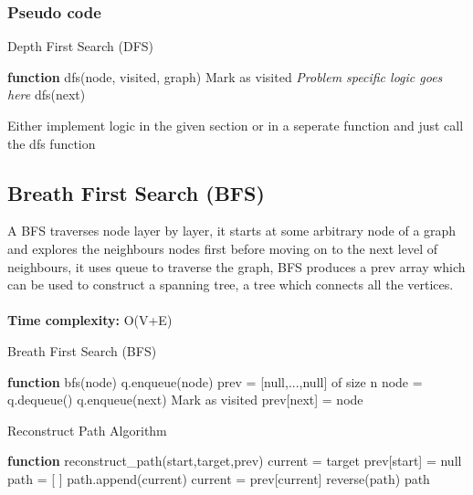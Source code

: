 \documentclass[12pt]{extarticle}
\begin{document}
\subsubsection*{Pseudo code}

\begin{algorithm} [H]
    \caption{Depth First Search (DFS)}
    \begin{algorithmic}[1]
        \STATE \textbf{function} dfs(node, visited, graph)
        \RETURN
        \ENDIF
        \STATE Mark as visited
        \STATE \textit{Problem specific logic goes here}
        \STATE dfs(next)
        \ENDFOR
    \end{algorithmic}
\end{algorithm}

Either implement logic in the given section or in a seperate function and just call 
the dfs function

\subsection{Breath First Search (BFS)}
A BFS traverses node layer by layer, it starts at some arbitrary node of a graph and explores the neighbours nodes first before moving on to the next level of neighbours, it uses queue to traverse the graph, BFS produces a prev array which can be used to construct
a spanning tree, a tree which connects all the vertices.\\ \\  
\textbf{Time complexity:} O(V+E)

\begin{algorithm}
    \caption {Breath First Search (BFS)}
    \begin{algorithmic}[1]
        \STATE \textbf{function} bfs(node)
        \STATE q.enqueue(node)
        \STATE prev = [null,...,null] of size n
        \STATE node = q.dequeue()
        \STATE q.enqueue(next)
        \STATE Mark as visited
        \STATE prev[next] = node
        \ENDIF
        \ENDFOR
        
        \ENDWHILE
    \end{algorithmic}
\end{algorithm}


\begin{algorithm} [H]
\caption{Reconstruct Path Algorithm}
    \begin{algorithmic}
        \STATE \textbf{function} reconstruct\_path(start,target,prev)
        \STATE current = target
        \STATE prev[start] = null 
        \STATE path = [ ]
        \STATE path.append(current)
        \STATE current = prev[current]
        \ENDWHILE
        \STATE reverse(path)
        \RETURN path
        \ELSE
        \RETURN [ ]
        \ENDIF
    \end{algorithmic}
\end{algorithm}
\end{document}
